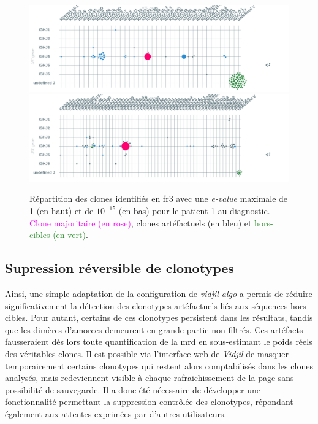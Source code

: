 \begin{figure}[H]
    \centering
    \includegraphics[width=1\textwidth]{images/diah_fr3_e1.png}
    \vspace{0.5cm}
    \includegraphics[width=1\textwidth]{images/diag_fr3_e-15.png}
    \caption{
        Répartition des clones identifiés en \gls{fr}3 avec une \textit{e-value} maximale de 1 (en haut) 
        et de $10^{-15}$ (en bas) pour le patient 1 au diagnostic. \textcolor{Magenta}{Clone majoritaire (en rose)}, 
        \textcolor{ProcessBlue}{clones artéfactuels (en bleu)} et \textcolor{ForestGreen}{hors-cibles (en vert)}.
    }
    \label{fig:fr3-evalue}
\end{figure}

\subsection{Supression réversible de clonotypes}

Ainsi, une simple adaptation de la configuration de \textit{vidjil-algo} a permis de réduire significativement la détection des clonotypes 
artéfactuels liés aux séquences hors-cibles. Pour autant, certains de ces clonotypes persistent dans les résultats, tandis que les dimères 
d'amorces demeurent en grande partie non filtrés. Ces artéfacts fausseraient dès lors toute quantification de la \gls{mrd} en sous-estimant 
le poids réels des véritables clones.
Il est possible via l'interface web de \textit{Vidjil} de masquer temporairement certains 
clonotypes qui restent alors comptabilisés dans les clones analysés, mais redeviennent visible à chaque rafraichissement de la page sans 
possibilité de sauvegarde. Il a donc été nécessaire de développer une fonctionnalité permettant la suppression contrôlée des clonotypes, 
répondant également aux attentes exprimées par d'autres utilisateurs.

